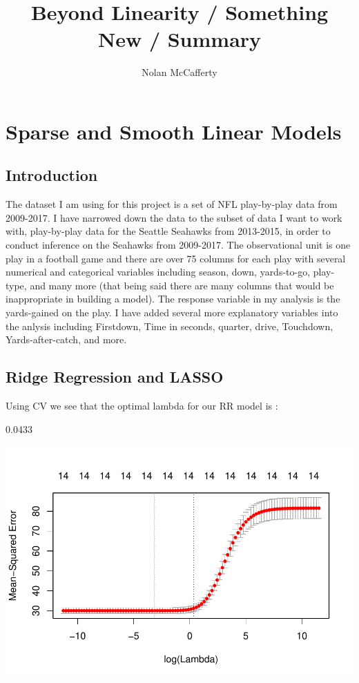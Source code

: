 \documentclass{article}
\title{Beyond Linearity / Something New / Summary}
\author{Nolan McCafferty}
\begin{document}

\maketitle





\section*{Sparse and Smooth Linear Models}

\subsection*{Introduction}

The dataset I am using for this project is a set of NFL play-by-play data from 2009-2017. I have narrowed down the data to the subset of data I want to work with, play-by-play data for the Seattle Seahawks from 2013-2015, in order to conduct inference on the Seahawks from 2009-2017. The observational unit is one play in a football game and there are over 75 columns for each play with several numerical and categorical variables including season, down, yards-to-go, play-type, and many more (that being said there are many columns that would be inappropriate in building a model). The response variable in my analysis is the yards-gained on the play. I have added several more explanatory variables into the anlysis including Firstdown, Time in seconds, quarter, drive, Touchdown, Yards-after-catch, and more. 

\subsection*{Ridge Regression and LASSO}

Using CV we see that the optimal lambda for our RR model is :


\begin{Schunk}
\begin{Soutput}
[1] 0.0433
\end{Soutput}
\end{Schunk}

\includegraphics{project4-005}
\end{document}
